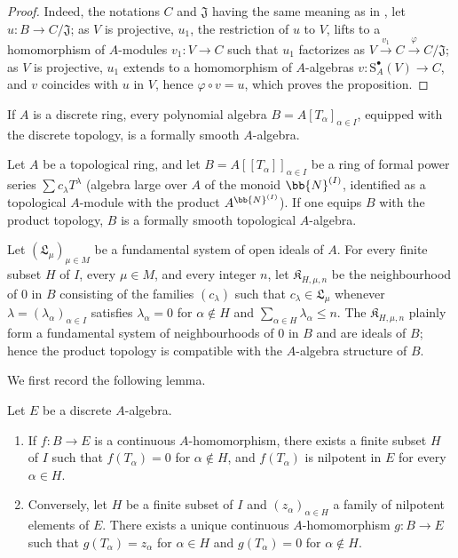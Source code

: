 \begin{proof}
Indeed, the notations $C$ and $\mathfrak{J}$ having the same meaning as in , let $u:B\to C/\mathfrak{J}$;
as $V$ is projective, $u_1$, the restriction of $u$ to $V$, lifts to a homomorphism of $A$-modules $v_1:V\to C$ such that $u_1$ factorizes as $V\xrightarrow{v_1}C\xrightarrow{\varphi}C/\mathfrak{J}$;
as $V$ is projective, $u_1$ extends to a homomorphism of $A$-algebras $v:\mathrm{S}_A^\bullet(V)\to C$, and $v$ coincides with $u$ in $V$, hence $\varphi\circ v=u$, which proves the proposition.
\end{proof}

\begin{corollary}[19.3.3]
\label{0.19.3.3}
If $A$ is a discrete ring, every polynomial algebra $B=A[T_\alpha]_{\alpha\in I}$, equipped with the discrete topology, is a formally smooth $A$-algebra.
\end{corollary}

\begin{proposition}[19.3.4]
\label{0.19.3.4}
Let $A$ be a topological ring, and let $B=A[[T_\alpha]]_{\alpha\in I}$ be a ring of formal power series $\sum c_\lambda T^\lambda$ (algebra large over $A$ of the monoid $\bb{N}^{(I)}$, identified as a topological $A$-module with the product $A^{\bb{N}^{(I)}}$).
If one equips $B$ with the product topology, $B$ is a formally smooth topological $A$-algebra.
\end{proposition}

Let $(\mathfrak{L}_\mu)_{\mu\in M}$ be a fundamental system of open ideals of $A$.
For every finite subset $H$ of $I$, every $\mu\in M$, and every integer $n$, let $\mathfrak{K}_{H,\mu,n}$ be the neighbourhood of $0$ in $B$ consisting of the families $(c_\lambda)$ such that $c_\lambda\in\mathfrak{L}_\mu$ whenever $\lambda=(\lambda_\alpha)_{\alpha\in I}$ satisfies $\lambda_\alpha=0$ for $\alpha\notin H$ and $\sum_{\alpha\in H}\lambda_\alpha\leq n$.
The $\mathfrak{K}_{H,\mu,n}$ plainly form a fundamental system of neighbourhoods of $0$ in $B$ and are ideals of $B$; hence the product topology is compatible with the $A$-algebra structure of $B$.

We first record the following lemma.

\begin{lemma}[19.3.4.1]
\label{0.19.3.4.1}
Let $E$ be a discrete $A$-algebra.
\begin{enumerate}
  \item[\rm(i)] If $f:B\to E$ is a continuous $A$-homomorphism, there exists a finite subset $H$ of $I$ such that $f(T_\alpha)=0$ for $\alpha\notin H$, and $f(T_\alpha)$ is nilpotent in $E$ for every $\alpha\in H$.
  \item[\rm(ii)] Conversely, let $H$ be a finite subset of $I$ and $(z_\alpha)_{\alpha\in H}$ a family of nilpotent elements of $E$.
  There exists a unique continuous $A$-homomorphism $g:B\to E$ such that $g(T_\alpha)=z_\alpha$ for $\alpha\in H$ and $g(T_\alpha)=0$ for $\alpha\notin H$.
\end{enumerate}
\end{lemma}

